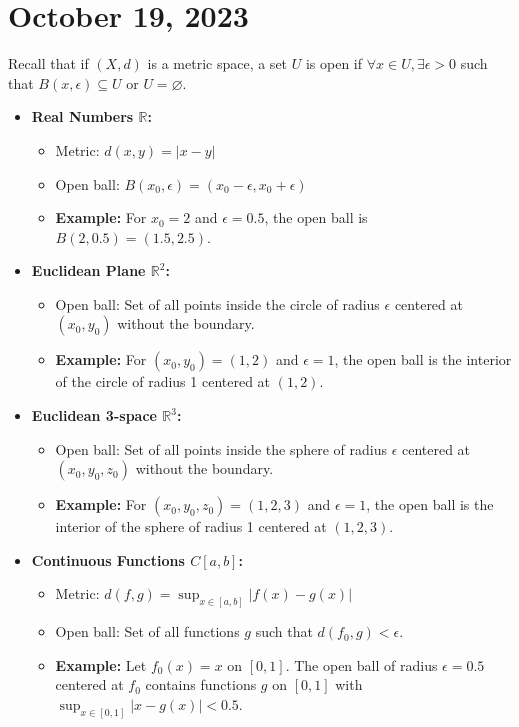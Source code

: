 \newpage
\section{October 19, 2023}
Recall that if $(X,d)$ is a metric space, a set $U$ is open if $\forall x \in U, \exists \epsilon > 0$ such that $B(x,\epsilon) \subseteq U$ or $U = \varnothing$.

\begin{itemize}

    \item \textbf{Real Numbers $\mathbb{R}$:}
        \begin{itemize}
            \item Metric: $d(x,y) = |x-y|$
            \item Open ball: $B(x_0,\epsilon) = (x_0 - \epsilon, x_0 + \epsilon)$
            \item \textbf{Example:} For $x_0 = 2$ and $\epsilon = 0.5$, the open ball is $B(2,0.5) = (1.5, 2.5)$.
        \end{itemize}
    
    \item \textbf{Euclidean Plane $\mathbb{R}^2$:}
        \begin{itemize}
            \item Open ball: Set of all points inside the circle of radius $\epsilon$ centered at $(x_0,y_0)$ without the boundary.
            \item \textbf{Example:} For $(x_0,y_0) = (1,2)$ and $\epsilon = 1$, the open ball is the interior of the circle of radius 1 centered at $(1,2)$.
        \end{itemize}
    
    \item \textbf{Euclidean 3-space $\mathbb{R}^3$:}
        \begin{itemize}
            \item Open ball: Set of all points inside the sphere of radius $\epsilon$ centered at $(x_0,y_0,z_0)$ without the boundary.
            \item \textbf{Example:} For $(x_0,y_0,z_0) = (1,2,3)$ and $\epsilon = 1$, the open ball is the interior of the sphere of radius 1 centered at $(1,2,3)$.
        \end{itemize}
    
    \item \textbf{Continuous Functions $C[a,b]$:}
        \begin{itemize}
            \item Metric: $d(f,g) = \sup_{x \in [a,b]} |f(x) - g(x)|$
            \item Open ball: Set of all functions $g$ such that $d(f_0,g) < \epsilon$.
            \item \textbf{Example:} Let $f_0(x) = x$ on $[0,1]$. The open ball of radius $\epsilon = 0.5$ centered at $f_0$ contains functions $g$ on $[0,1]$ with $\sup_{x \in [0,1]} |x - g(x)| < 0.5$.
        \end{itemize}
    
\end{itemize}


